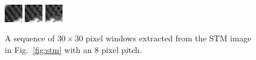 \documentclass[11pt]{article}
\begin{document}
\begin{figure}[H]
\includegraphics[width=0.07\textwidth]{figs/default_2011Jan07-144939_STM-STM_Spectroscopy--1_1_BD_00040}
\hspace{0.2em}
\includegraphics[width=0.07\textwidth]{figs/default_2011Jan07-144939_STM-STM_Spectroscopy--1_1_BD_00041}
\hspace{0.2em}
\includegraphics[width=0.07\textwidth]{figs/default_2011Jan07-144939_STM-STM_Spectroscopy--1_1_BD_00042}
\caption{A sequence of $30\times30$ pixel windows extracted from the STM image in Fig.~\ref{fig:stm} with an 8 pixel pitch.}
\end{figure}
\end{document}
